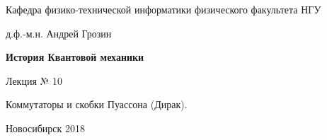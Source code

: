 \documentclass[12pt,pagesize,paper=landscape,paper=192mm:108mm]{scrbook}
\begin{document}
\begin{titlepage}
\begin{center}
    Кафедра физико-технической информатики физического факультета НГУ
    \medskip

    \Large
    д.ф.-м.н. Андрей Грозин
    
    \bigskip

    \huge
    \textbf{История Квантовой механики}
    \bigskip

    \Large
    Лекция № 10
    \vfill

    \normalsize
    \begin{minipage}{0.56\linewidth}
      \centering
      Коммутаторы и скобки Пуассона (Дирак).
    \end{minipage}
    \vfill

    \normalsize \ccbysa\hspace{0.5em}  Новосибирск 2018
  \end{center}
\end{titlepage}
\end{document}
